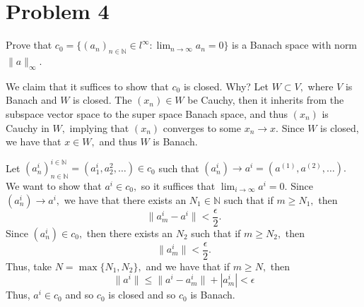 \documentclass[11pt]{article}
\newcommand{\bbN}{\mathbb{N}}
\begin{document}
\section*{Problem 4}
\begin{problem}
    Prove that \( c_0 = \{ (a_n)_{n \in \mathbb{N}} \in l^\infty : \lim_{n \to \infty} a_n = 0 \} \) is a Banach space with norm \( \|a\|_\infty \).
\end{problem}
\begin{solution}
    We claim that it suffices to show that $c_0$ is closed. Why? Let $W\subset V,$ where $V$ is Banach and $W$ is closed. The $(x_n) \in W$ be Cauchy, then it inherits from the subspace vector space to the super space Banach space, and thus $(x_n)$ is Cauchy in $W,$ implying that $(x_n)$ converges to some $x_n \to x.$ Since $W$ is closed, we have that $x\in W,$ and thus $W$ is Banach. 

    Let $(a_n^{i})_{n\in \bbN}^{i \in \bbN} = (a_{1}^{i}, a_{2}^{2}, \dots) \in c_0$ such that $(a_n^i) \to a^i = (a^{(1)}, a^{(2)}, \dots).$ We want to show that $a^i \in c_0,$ so it suffices that $\displaystyle\lim_{i\to \infty} a^i = 0.$ Since $(a_n^i) \to a^i,$ we have that there exists an $N_1 \in \bbN$ such that if $m\geq N_1,$ then 
    \[\|a_m^i - a^i\| < \frac{\epsilon}{2}.\] Since $(a_n^i) \in c_0,$ then there exists an $N_2$ such that if $m \geq N_2,$ then 
    \[\|a_m^i\| < \frac{\epsilon}{2}.\] Thus, take $N = \max\{N_1, N_2\},$ and we have that if $m\geq N,$ then
    \[\|a^i\| \leq \|a^i - a_m^i\| + |a_m^i| < \epsilon\] Thus, $a^i \in c_0$ and so $c_0$ is closed and so $c_0$ is Banach.
\end{solution}

\newpage
\end{document}
